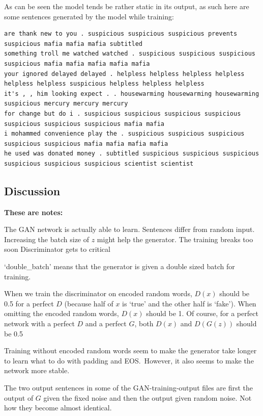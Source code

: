 \documentclass{article}
\begin{document}
As can be seen the model tends be rather static in its output, as such here are some sentences generated by the model while training:
\footnotesize
\begin{verbatim}
are thank new to you . suspicious suspicious suspicious prevents suspicious mafia mafia mafia subtitled
something troll me watched watched . suspicious suspicious suspicious suspicious mafia mafia mafia mafia mafia
your ignored delayed delayed . helpless helpless helpless helpless helpless helpless suspicious helpless helpless helpless
it's , , him looking expect . . housewarming housewarming housewarming suspicious mercury mercury mercury
for change but do i . suspicious suspicious suspicious suspicious suspicious suspicious suspicious mafia mafia
i mohammed convenience play the . suspicious suspicious suspicious suspicious suspicious mafia mafia mafia mafia
he used was donated money . subtitled suspicious suspicious suspicious suspicious suspicious suspicious scientist scientist
\end{verbatim}
\normalsize

\subsection{Discussion}\label{sec:discussion}

\textbf{These are notes:}

The GAN network is actually able to learn.
Sentences differ from random input.
Increasing the batch size of $z$ might help the generator.
The training breaks too soon
Discriminator gets to critical

`double\_batch' means that the generator is given a double sized batch for
training.

When we train the discriminator on encoded random words, $D(x)$ should be 0.5
for a perfect $D$ (because half of $x$ is `true' and the other half is `fake').
When omitting the encoded random words, $D(x)$ should be 1. Of course, for a
perfect network with a perfect $D$ and a perfect $G$, both $D(x)$ and $D(G(z))$
should be 0.5 

Training without encoded random words seem to make the generator take longer to
learn what to do with padding and EOS.\ However, it also seems to make the
network more stable.

The two output sentences in some of the GAN-training-output files are first the
output of $G$ given the fixed noise and then the output given random noise. Not
how they become almost identical.
\end{document}
